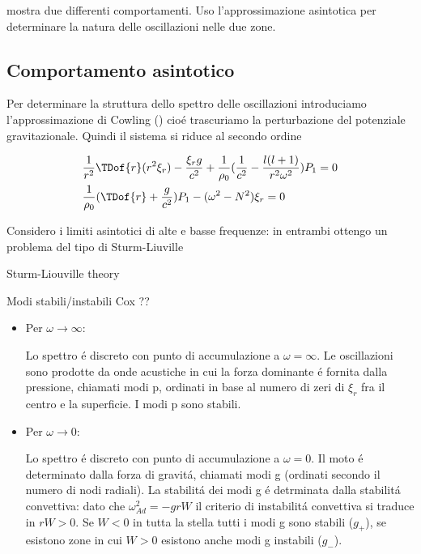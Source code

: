 mostra due differenti comportamenti. Uso l'approssimazione asintotica per determinare la natura delle oscillazioni nelle due zone.

\clearpage

\subsection{Comportamento asintotico}


Per determinare la struttura dello spettro delle oscillazioni introduciamo l'approssimazione di Cowling (\cite{cow41oscillations}) cio\'e trascuriamo la perturbazione del potenziale gravitazionale. Quindi il sistema si riduce al secondo ordine

\begin{align}
&\frac{1}{r^2}\TDof{r}(r^2\xi_r)-\frac{\xi_rg}{c^2}+\frac{1}{\rho_0}(\frac{1}{c^2}-\frac{l(l+1)}{r^2\omega^2})P_1=0\label{eq:cowosc}\\
&\frac{1}{\rho_0}(\TDof{r}+\frac{g}{c^2})P_1-(\omega^2-N^2)\xi_r=0\nonumber
\end{align}

Considero i limiti asintotici di alte e basse frequenze: in entrambi ottengo un problema del tipo di Sturm-Liuville

\begin{todo}{Sturm-Liouville theory}
\end{todo}

\begin{todo}{Modi stabili/instabili}
Cox ??
\end{todo}

\begin{itemize}
\item Per $\omega\to\infty$:

Lo spettro \'e discreto con punto di accumulazione a $\omega=\infty$.
Le oscillazioni sono prodotte da onde acustiche in cui la forza dominante \'e fornita dalla pressione, chiamati modi p, ordinati in base al numero di zeri di $\xi_r$ fra il centro e la superficie. I modi p sono stabili.

\item Per $\omega\to0$:

Lo spettro \'e discreto con punto di accumulazione a $\omega=0$.
Il moto \'e determinato dalla forza di gravit\'a, chiamati modi g (ordinati secondo il numero di nodi radiali). La stabilit\'a dei modi g \'e detrminata dalla stabilit\'a convettiva: dato che $\omega^2_{Ad}=-grW$ il criterio di instabilit\'a convettiva si traduce in $rW>0$. Se $W<0$ in tutta la stella tutti i modi g sono stabili ($g_+$), se esistono zone in cui $W>0$ esistono anche modi g instabili ($g_-$).
\end{itemize}

